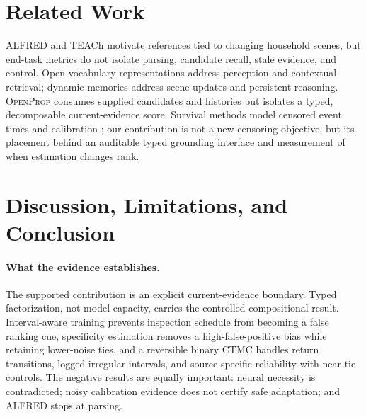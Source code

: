 \documentclass{article}
\newcommand{\method}{\textsc{OpenProp}}
\begin{document}
\section{Related Work}
ALFRED and TEACh \citep{shridhar2020alfred,padmakumar2022teach} motivate references tied to changing household scenes, but end-task metrics do not isolate parsing, candidate recall, stale evidence, and control. Open-vocabulary representations \citep{gu2024conceptgraphs,chang2023ovsg,koch2024open3dsg} address perception and contextual retrieval; dynamic memories \citep{kurenkov2023sgm,liu2024dynamem,yang2025threedmem,fan2025videoagent} address scene updates and persistent reasoning. \method{} consumes supplied candidates and histories but isolates a typed, decomposable current-evidence score. Survival methods model censored event times and calibration \citep{lee2018deephit,avati2020survivalcrps}; our contribution is not a new censoring objective, but its placement behind an auditable typed grounding interface and measurement of when estimation changes rank.

\section{Discussion, Limitations, and Conclusion}
\paragraph{What the evidence establishes.}
The supported contribution is an explicit current-evidence boundary. Typed factorization, not model capacity, carries the controlled compositional result. Interval-aware training prevents inspection schedule from becoming a false ranking cue, specificity estimation removes a high-false-positive bias while retaining lower-noise ties, and a reversible binary CTMC handles return transitions, logged irregular intervals, and source-specific reliability with near-tie controls. The negative results are equally important: neural necessity is contradicted; noisy calibration evidence does not certify safe adaptation; and ALFRED stops at parsing.
\end{document}
